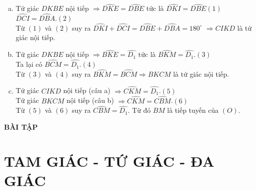 \begin{vd}
{		\begin{enumerate}[a)]
			\item Tứ giác $DKBE$ nội tiếp $\Rightarrow \widehat{DKE}=\widehat{DBE}$ tức là $\widehat{DKI}=\widehat{DBE}$\hfill$(1)$\\
			$\widehat{DCI}=\widehat{DBA}$.\hfill$(2)$\\
			Từ $(1)$ và $(2)$ suy ra $\widehat{DKI}+\widehat{DCI}=\widehat{DBE}+\widehat{DBA}=180^{\circ}$ $\Rightarrow CIKD$ là tứ giác nội tiếp.
			\item Tứ giác $DKBE$ nội tiếp $\Rightarrow \widehat{BKE}=\widehat{D_1}$ tức là $\widehat{BKM}=\widehat{D_1}$.\hfill$(3)$\\
			Ta lại có $\widehat{BCM}=\widehat{D_1}$.\hfill$(4)$\\
			Từ $(3)$ và $(4)$ suy ra $\widehat{BKM}=\widehat{BCM}\Rightarrow BKCM$ là tứ giác nội tiếp.
			\item Tứ giác $CIKD$ nội tiếp (câu a) $\Rightarrow \widehat{CKM}=\widehat{D_1}$.\hfill$(5)$\\
			Tứ giác $BKCM$ nội tiếp (câu b) $\Rightarrow \widehat{CKM}=\widehat{CBM}$.\hfill$(6)$\\
			Từ $(5)$ và $(6)$ suy ra $\widehat{CBM}=\widehat{D_1}$. Từ đó $BM$ là tiếp tuyến của $(O)$.
		\end{enumerate}
		
	}
\end{vd}
\begin{center}
	\large \textbf{BÀI TẬP}
\end{center}
\section{TAM GIÁC - TỨ GIÁC - ĐA GIÁC}
